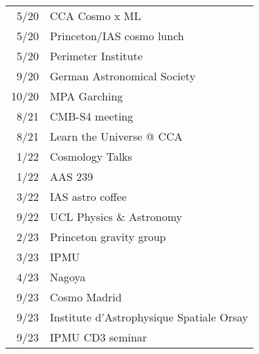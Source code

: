 \begin{tabular}{r l}
 5/20 & CCA Cosmo x ML \\
 5/20 & Princeton/IAS cosmo lunch \\
 5/20 & Perimeter Institute \\
 9/20 & German Astronomical Society \\
10/20 & MPA Garching \\
 8/21 & CMB-S4 meeting \\
 8/21 & Learn the Universe @ CCA \\
 1/22 & Cosmology Talks \\
 1/22 & AAS 239 \\
 3/22 & IAS astro coffee \\
 9/22 & UCL Physics \& Astronomy \\
 2/23 & Princeton gravity group \\
 3/23 & IPMU \\
 4/23 & Nagoya \\
 9/23 & Cosmo Madrid \\
 9/23 & Institute d'Astrophysique Spatiale Orsay \\
 9/23 & IPMU CD3 seminar \\
\end{tabular}
